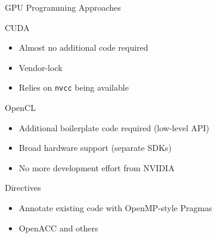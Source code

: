 \begin{frame}{GPU Programming Approaches}
 
  \begin{block}{CUDA}
   \begin{itemize}
   \item Almost no additional code required
   \item Vendor-lock
   \item Relies on \lstinline|nvcc| being available
  \end{itemize}

  \end{block}

  \begin{block}{OpenCL}
  \begin{itemize}
   \item Additional boilerplate code required (low-level API)
   \item Broad hardware support (separate SDKs)
   \item No more development effort from NVIDIA
  \end{itemize}
  \end{block}

  \begin{block}{Directives}
   \begin{itemize}
    \item Annotate existing code with OpenMP-style Pragmas
    \item OpenACC and others
   \end{itemize}

  \end{block}

\end{frame}



